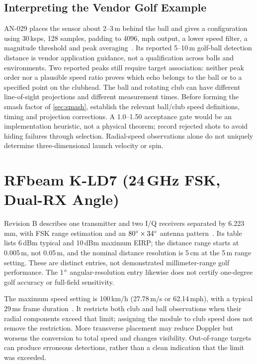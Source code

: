 \subsection{Interpreting the Vendor Golf Example}
AN-029 places the sensor about 2--3\,m behind the ball and gives a configuration using 30\,ksps, 128 samples, padding to 4096, mph output, a lower speed filter, a magnitude threshold and peak averaging~\cite{an029}.
Its reported 5--10\,m golf-ball detection distance is vendor application guidance, not a qualification across balls and environments.
Two reported peaks still require target association: neither peak order nor a plausible speed ratio proves which echo belongs to the ball or to a specified point on the clubhead.
The ball and rotating club can have different line-of-sight projections and different measurement times.
Before forming the smash factor of \cref{sec:smash}, establish the relevant ball/club speed definitions, timing and projection corrections.
A 1.0--1.50 acceptance gate would be an implementation heuristic, not a physical theorem; record rejected shots to avoid hiding failures through selection.
Radial-speed observations alone do not uniquely determine three-dimensional launch velocity or spin.

\section{RFbeam K-LD7 (24\,GHz FSK, Dual-RX Angle)}

Revision B describes one transmitter and two I/Q receivers separated by 6.223\,mm, with FSK range estimation and an $80\si{\degree}\times34\si{\degree}$ antenna pattern~\cite{kld7}.
Its table lists 6\,dBm typical and 10\,dBm maximum EIRP; the distance range starts at 0.005\,m, not 0.05\,m, and the nominal distance resolution is 5\,cm at the 5\,m range setting.
These are distinct entries, not demonstrated millimeter-range golf performance.
The 1$\si{\degree}$ angular-resolution entry likewise does not certify one-degree golf accuracy or full-field sensitivity.

The maximum speed setting is 100\,km/h (27.78\,m/s or 62.14\,mph), with a typical 29\,ms frame duration~\cite{kld7}.
It restricts both club and ball observations when their radial components exceed that limit; assigning the module to club speed does not remove the restriction.
More transverse placement may reduce Doppler but worsens the conversion to total speed and changes visibility.
Out-of-range targets can produce erroneous detections, rather than a clean indication that the limit was exceeded.

